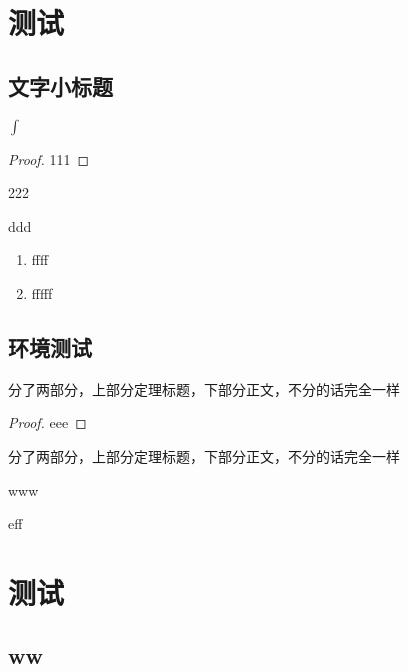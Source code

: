 \chapter{测试}
\section{文字小标题}
$\int$
\begin{proof}
	111
\end{proof}

\begin{solution}
	222
\end{solution}
\begin{example}ddd
\begin{enumerate}
\item ffff

 \item fffff
\end{enumerate}


\end{example}
\begin{problem}

\end{problem}


\begin{theorem}[三角形]
	
\end{theorem}
\section{环境测试}
\begin{theorem}
	分了两部分，上部分定理标题，下部分正文，不分的话完全一样
    \begin{proof}
	eee
\end{proof}

\end{theorem}
\begin{definition}
	分了两部分，上部分定理标题，下部分正文，不分的话完全一样
\end{definition}
\begin{corollary}
    www
\end{corollary}
\begin{proposition}
eff
\end{proposition}
\chapter{测试}
\section{ww}
\begin{theorem}
	
\end{theorem}

